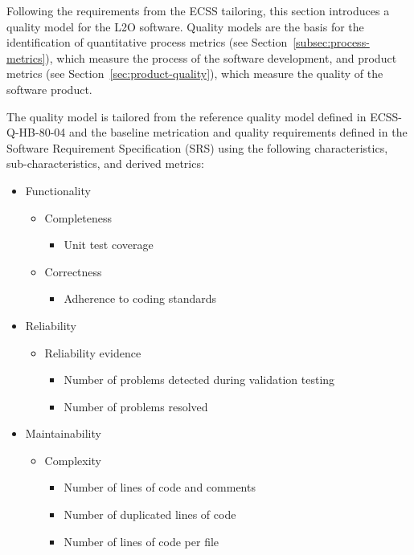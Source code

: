 Following the requirements from the ECSS tailoring, this section introduces a quality model for the L2O software. Quality models are the basis for the identification of quantitative process metrics (see Section~\ref{subsec:process-metrics}), which measure the process of the software development, and product metrics (see Section~\ref{sec:product-quality}), which measure the quality of the software product.

The quality model is tailored from the reference quality model defined in ECSS-Q-HB-80-04 and the baseline metrication and quality requirements defined in the Software Requirement Specification (SRS) using the following characteristics, sub-characteristics, and derived metrics:

\begin{itemize}
    \item Functionality
    \begin{itemize}
        \item Completeness
        \begin{itemize}
            \item Unit test coverage
        \end{itemize}
        \item Correctness
        \begin{itemize}
            \item Adherence to coding standards
        \end{itemize}
    \end{itemize}
    \item Reliability
    \begin{itemize}
        \item Reliability evidence
        \begin{itemize}
            \item Number of problems detected during validation testing
            \item Number of problems resolved
        \end{itemize}
    \end{itemize}
    \item Maintainability
    \begin{itemize}
        \item Complexity
        \begin{itemize}
            \item Number of lines of code and comments
            \item Number of duplicated lines of code
            \item Number of lines of code per file

\end{itemize}
\end{itemize}
\end{itemize}
